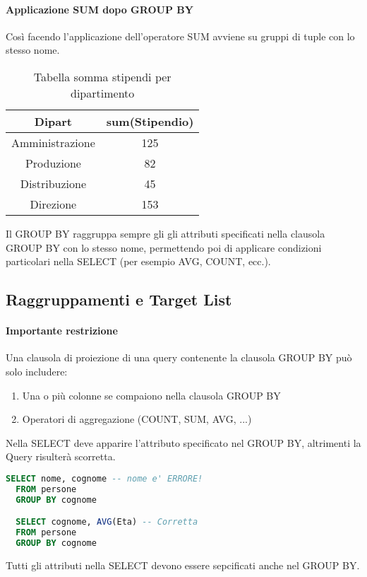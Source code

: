 \paragraph*{Applicazione SUM dopo GROUP BY} 
Così facendo l'applicazione dell'operatore SUM avviene su gruppi di tuple con lo stesso nome.
\begin{table}[h]
  \centering
  \begin{tabular}{|c|c|}
    \hline
    Dipart & sum(Stipendio) \\
    \hline
    Amministrazione & 125 \\
    \hline
    Produzione & 82 \\
    \hline
    Distribuzione & 45\\
    \hline
    Direzione & 153 \\
    \hline
  \end{tabular}
  \caption{Tabella somma stipendi per dipartimento}
  \label{tabella_stipendi}
\end{table}
\newpage
Il GROUP BY raggruppa sempre gli gli attributi specificati nella clausola GROUP BY con lo stesso
nome, permettendo poi di applicare condizioni particolari nella SELECT (per esempio AVG, COUNT, ecc.).
\subsection{Raggruppamenti e Target List}
\paragraph*{Importante restrizione} Una clausola di proiezione di una query contenente la clausola
GROUP BY può solo includere:
\begin{enumerate}
  \item Una o più colonne se compaiono nella clausola GROUP BY
  \item Operatori di aggregazione (COUNT, SUM, AVG, ...)
\end{enumerate}
Nella SELECT deve apparire l'attributo specificato nel GROUP BY, altrimenti la Query risulterà
scorretta.
\begin{lstlisting}[language=SQL]
  SELECT nome, cognome -- nome e' ERRORE!
  FROM persone
  GROUP BY cognome

  SELECT cognome, AVG(Eta) -- Corretta
  FROM persone
  GROUP BY cognome
\end{lstlisting}
Tutti gli attributi nella SELECT devono essere sepcificati anche nel GROUP BY.
